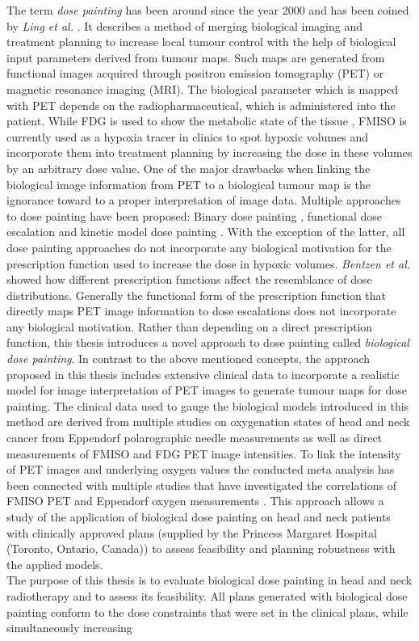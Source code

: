 The term \textit{dose painting} has been around since the year 2000 and has been coined by \textit{Ling et al.} \cite{pmid10837935}. It describes a method of merging biological imaging and treatment planning to increase local tumour control with the help of biological input parameters derived from tumour maps. Such maps are generated from functional images acquired through positron emission tomography (PET) or magnetic resonance imaging (MRI). The biological parameter which is mapped with PET depends on the radiopharmaceutical, which is administered into the patient. While FDG is used to show the metabolic state of the tissue \cite{pmid16841141}, FMISO is currently used as a hypoxia tracer in clinics to spot hypoxic volumes and incorporate them into treatment planning by increasing the dose in these volumes by an arbitrary dose value. One of the major drawbacks when linking the biological image information from PET to a biological tumour map is the ignorance toward to a proper interpretation of image data. Multiple approaches to dose painting have been proposed: Binary dose painting \cite{pmid20855118, pmid11240261, pmid17869020}, functional dose escalation \cite{pmid12587912, pmid21356478, pmid20643512, pmid18635895} and kinetic model dose painting \cite{pmid17448882}. With the exception of the latter, all dose painting approaches do not incorporate any biological motivation for the prescription function used to increase the dose in hypoxic volumes. \textit{Bentzen et al.} \cite{pmid19218733} showed how different prescription functions affect the resemblance of dose distributions. Generally the functional form of the prescription function that directly maps PET image information to dose escalations does not incorporate any biological motivation. Rather than depending on a direct prescription function, this thesis introduces a novel approach to dose painting called \textit{biological dose painting}. In contrast to the above mentioned concepts, the approach proposed in this thesis includes extensive clinical data to incorporate a realistic model for image interpretation of PET images to generate tumour maps for dose painting. The clinical data used to gauge the biological models introduced in this method are derived from multiple studies on oxygenation states of head and neck cancer from Eppendorf polarographic needle measurements as well as direct measurements of FMISO and FDG PET image intensities. To link the intensity of PET images and underlying oxygen values the conducted meta analysis has been connected with multiple studies that have investigated the correlations of FMISO PET and Eppendorf oxygen measurements \cite{pmid17598907, pmid12865184, pmid20831480}. This approach allows a study of the application of biological dose painting on head and neck patients with clinically approved plans (supplied by the Princess Margaret Hospital (Toronto, Ontario, Canada)) to assess feasibility and planning robustness with the applied models.\\The purpose of this thesis is to evaluate biological dose painting in head and neck radiotherapy and to assess its feasibility. All plans generated with biological dose painting conform to the dose constraints that were set in the clinical plans, while simultaneously increasing 